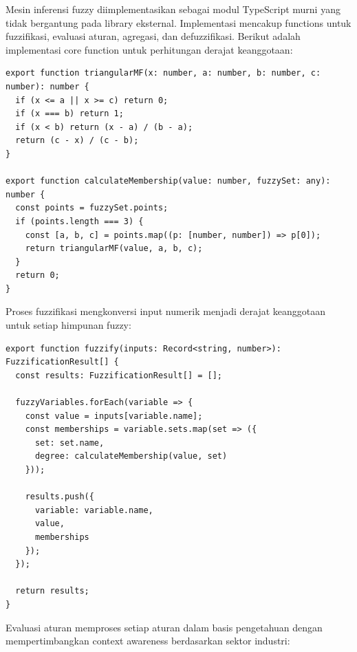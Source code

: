 \documentclass[12pt,a4paper]{article}
\begin{document}
Mesin inferensi fuzzy diimplementasikan sebagai modul TypeScript murni yang tidak bergantung pada library eksternal. Implementasi mencakup functions untuk fuzzifikasi, evaluasi aturan, agregasi, dan defuzzifikasi. Berikut adalah implementasi core function untuk perhitungan derajat keanggotaan:

\begin{verbatim}
export function triangularMF(x: number, a: number, b: number, c: number): number {
  if (x <= a || x >= c) return 0;
  if (x === b) return 1;
  if (x < b) return (x - a) / (b - a);
  return (c - x) / (c - b);
}

export function calculateMembership(value: number, fuzzySet: any): number {
  const points = fuzzySet.points;
  if (points.length === 3) {
    const [a, b, c] = points.map((p: [number, number]) => p[0]);
    return triangularMF(value, a, b, c);
  }
  return 0;
}
\end{verbatim}

Proses fuzzifikasi mengkonversi input numerik menjadi derajat keanggotaan untuk setiap himpunan fuzzy:

\begin{verbatim}
export function fuzzify(inputs: Record<string, number>): FuzzificationResult[] {
  const results: FuzzificationResult[] = [];
  
  fuzzyVariables.forEach(variable => {
    const value = inputs[variable.name];
    const memberships = variable.sets.map(set => ({
      set: set.name,
      degree: calculateMembership(value, set)
    }));
    
    results.push({
      variable: variable.name,
      value,
      memberships
    });
  });
  
  return results;
}
\end{verbatim}

Evaluasi aturan memproses setiap aturan dalam basis pengetahuan dengan mempertimbangkan context awareness berdasarkan sektor industri:
\end{document}
